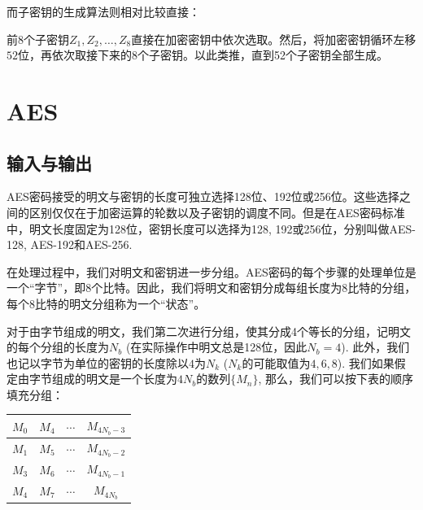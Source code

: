 而子密钥的生成算法则相对比较直接：\par
前8个子密钥$Z_1, Z_2, \ldots, Z_8$直接在加密密钥中依次选取。然后，将加密密钥循环左移$52$位，再依次取接下来的8个子密钥。以此类推，直到52个子密钥全部生成。
\section{AES}
\subsection{输入与输出}
AES密码接受的明文与密钥的长度可独立选择128位、192位或256位。这些选择之间的区别仅仅在于加密运算的轮数以及子密钥的调度不同。但是在AES密码标准中，明文长度固定为128位，密钥长度可以选择为128, 192或256位，分别叫做AES-128, AES-192和AES-256.\par
在处理过程中，我们对明文和密钥进一步分组。AES密码的每个步骤的处理单位是一个“字节”，即8个比特。因此，我们将明文和密钥分成每组长度为8比特的分组，每个8比特的明文分组称为一个“状态”。\par
对于由字节组成的明文，我们第二次进行分组，使其分成4个等长的分组，记明文的每个分组的长度为$N_b$ (在实际操作中明文总是128位，因此$N_b=4$). 此外，我们也记以字节为单位的密钥的长度除以$4$为$N_k$ ($N_k$的可能取值为$4, 6, 8$). 我们如果假定由字节组成的明文是一个长度为$4N_b$的数列$\{M_n\}$, 那么，我们可以按下表的顺序填充分组：
\begin{table}[H]
\centering
\begin{tabular}{c|c|c|c}\hline
$M_0$&$M_4$&$\cdots$&$M_{4N_b-3}$\\\hline
$M_1$&$M_5$&$\cdots$&$M_{4N_b-2}$\\\hline
$M_3$&$M_6$&$\cdots$&$M_{4N_b-1}$\\\hline
$M_4$&$M_7$&$\cdots$&$M_{4N_b}$\\\hline
\end{tabular}
\end{table}

